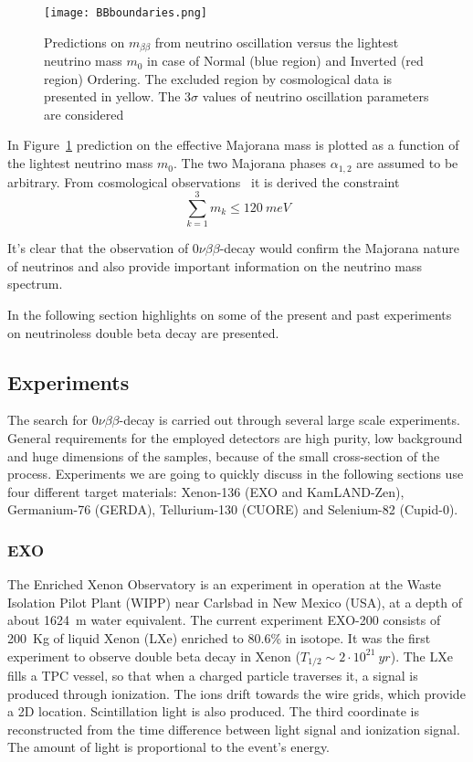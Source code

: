 \documentclass{subnucbo}
\begin{document}
\begin{figure}[h]
\centering
\texttt{[image: BBboundaries.png]}
\caption{Predictions on $m_{\beta\beta}$ from neutrino oscillation versus the lightest neutrino mass $m_0$ in case of Normal (blue region) and Inverted (red region) Ordering. The excluded region by cosmological data is presented in yellow. The $3\sigma$ values of neutrino oscillation parameters are considered~\cite{ref:ver}}
\label{fig:BBbound}
\end{figure}
In Figure~\ref{fig:BBbound} prediction on the effective Majorana mass is plotted as a function of the lightest neutrino mass $m_0$. The two Majorana phases $\alpha_{1,2}$ are assumed to be arbitrary. From cosmological observations~\cite{ref:cosm} it is derived the constraint~\cite[sec.25]{ref:pdgBos}
\begin{equation}
\sum_{k=1}^3m_k\leq\SI{120}{meV}
\end{equation}

It's clear that the observation of $0\nu\beta\beta$-decay would confirm the Majorana nature of neutrinos and also provide important  information on the neutrino mass spectrum.

In the following section highlights on some of the present and past experiments on neutrinoless double beta decay are presented.

\subsection{Experiments}
The search for $0\nu\beta\beta$-decay is carried out through several large scale experiments. General requirements for the employed detectors are high purity, low background and huge dimensions of the samples, because of the small cross-section of the process.
Experiments we are going to quickly discuss in the following sections use four different target materials: Xenon-136 (EXO and KamLAND-Zen), Germanium-76 (GERDA), Tellurium-130 (CUORE) and Selenium-82 (Cupid-0).

\subsubsection{EXO}
The Enriched Xenon Observatory is an experiment in operation at the Waste Isolation Pilot Plant (WIPP) near Carlsbad in New Mexico (USA), at a depth of about \SI{1624}{m} water equivalent.
The current experiment EXO-200 consists of \SI{200}{Kg} of liquid Xenon (LXe) enriched to 80.6\% in  isotope.  It was the first experiment to observe double beta decay in Xenon ($T_{1/2}\sim 2\cdot10^{21}\SI{}{yr}$).
The LXe fills a TPC vessel, so that when a charged particle traverses it, a signal is produced through ionization. The ions drift towards the wire grids, which provide a 2D location. Scintillation light is also produced. The third coordinate is reconstructed from the time difference between light signal and ionization signal. The amount of light is proportional to the event's energy.
\end{document}
